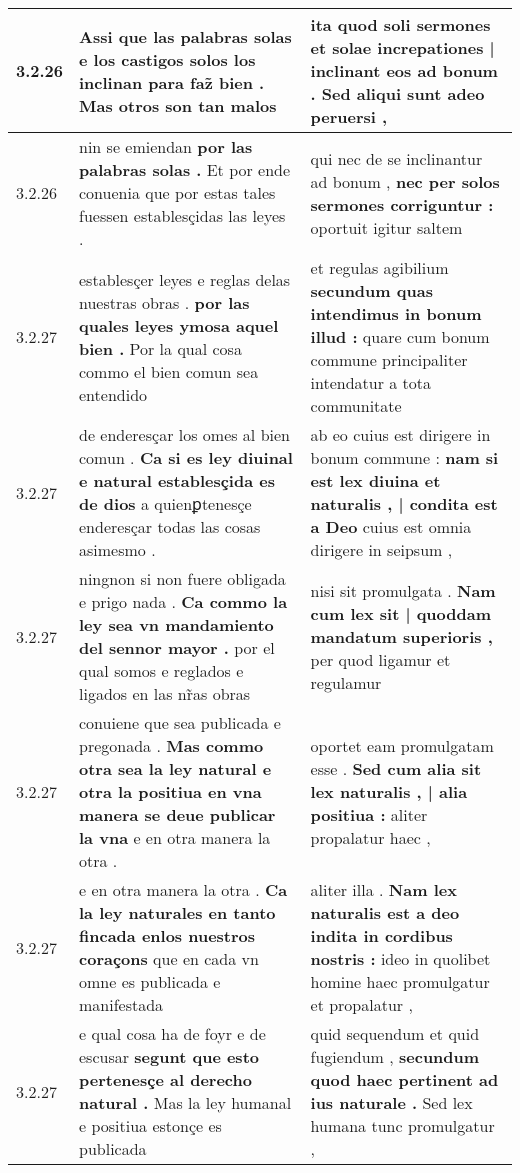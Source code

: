 \begin{tabular}{|p{1cm}|p{6.5cm}|p{6.5cm}|}
3.2.26 & Assi que las palabras solas \textbf{ e los castigos solos los inclinan para faz̃ bien . } Mas otros son tan malos & ita quod soli sermones \textbf{ et solae increpationes | inclinant eos ad bonum . } Sed aliqui sunt adeo peruersi , \\\hline
3.2.26 & nin se emiendan \textbf{ por las palabras solas . } Et por ende conuenia que por estas tales fuessen establesçidas las leyes . & qui nec de se inclinantur ad bonum , \textbf{ nec per solos sermones corriguntur : } oportuit igitur saltem \\\hline
3.2.27 & establesçer leyes e reglas delas nuestras obras . \textbf{ por las quales leyes ymosa aquel bien . } Por la qual cosa commo el bien comun sea entendido & et regulas agibilium \textbf{ secundum quas intendimus in bonum illud : } quare cum bonum commune principaliter intendatur a tota communitate \\\hline
3.2.27 & de enderesçar los omes al bien comun . \textbf{ Ca si es ley diuinal e natural establesçida es de dios } a quienꝑtenesçe enderesçar todas las cosas asimesmo . & ab eo cuius est dirigere in bonum commune : \textbf{ nam si est lex diuina et naturalis , | condita est a Deo } cuius est omnia dirigere in seipsum , \\\hline
3.2.27 & ningnon si non fuere obligada e prigo nada . \textbf{ Ca commo la ley sea vn mandamiento del sennor mayor . } por el qual somos e reglados e ligados en las nr̃as obras & nisi sit promulgata . \textbf{ Nam cum lex sit | quoddam mandatum superioris , } per quod ligamur et regulamur \\\hline
3.2.27 & conuiene que sea publicada e pregonada . \textbf{ Mas commo otra sea la ley natural e otra la positiua en vna manera se deue publicar la vna } e en otra manera la otra . & oportet eam promulgatam esse . \textbf{ Sed cum alia sit lex naturalis , | alia positiua : } aliter propalatur haec , \\\hline
3.2.27 & e en otra manera la otra . \textbf{ Ca la ley naturales en tanto fincada enlos nuestros coraçons } que en cada vn omne es publicada e manifestada & aliter illa . \textbf{ Nam lex naturalis est a deo indita in cordibus nostris : } ideo in quolibet homine haec promulgatur et propalatur , \\\hline
3.2.27 & e qual cosa ha de foyr e de escusar \textbf{ segunt que esto pertenesçe al derecho natural . } Mas la ley humanal e positiua estonçe es publicada & quid sequendum et quid fugiendum , \textbf{ secundum quod haec pertinent ad ius naturale . } Sed lex humana tunc promulgatur , \\\hline

\end{tabular}
